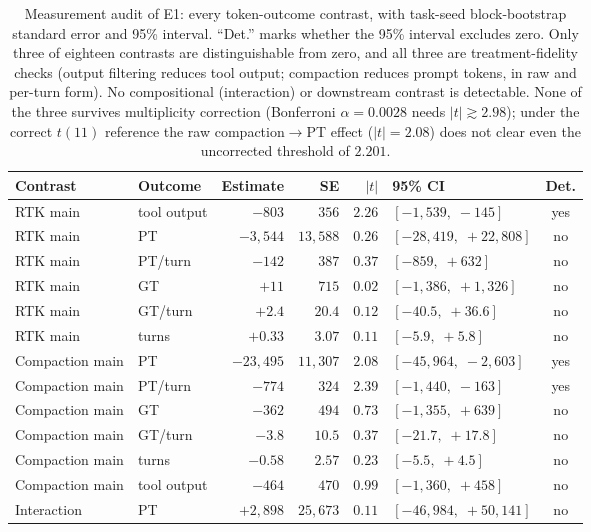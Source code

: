 \documentclass{article}
\begin{document}
\begin{table}[!htbp]
\caption{Measurement audit of E1: every token-outcome contrast, with task-seed block-bootstrap standard error and 95\% interval. ``Det.'' marks whether the 95\% interval excludes zero. Only three of eighteen contrasts are distinguishable from zero, and all three are treatment-fidelity checks (output filtering reduces tool output; compaction reduces prompt tokens, in raw and per-turn form). No compositional (interaction) or downstream contrast is detectable. None of the three survives multiplicity correction (Bonferroni $\alpha=0.0028$ needs $|t|\gtrsim2.98$); under the correct $t(11)$ reference the raw compaction$\rightarrow$PT effect ($|t|=2.08$) does not clear even the uncorrected threshold of $2.201$.}
\label{tab:audit}
\centering
\footnotesize
\setlength{\tabcolsep}{4pt}
\begin{tabularx}{\textwidth}{@{}llrrrXc@{}}
\toprule
Contrast & Outcome & Estimate & SE & $|t|$ & 95\% CI & Det. \\
\midrule
RTK main & tool output & $-803$ & $356$ & $2.26$ & $[-1{,}539,\;-145]$ & yes \\
RTK main & PT & $-3{,}544$ & $13{,}588$ & $0.26$ & $[-28{,}419,\;+22{,}808]$ & no \\
RTK main & PT/turn & $-142$ & $387$ & $0.37$ & $[-859,\;+632]$ & no \\
RTK main & GT & $+11$ & $715$ & $0.02$ & $[-1{,}386,\;+1{,}326]$ & no \\
RTK main & GT/turn & $+2.4$ & $20.4$ & $0.12$ & $[-40.5,\;+36.6]$ & no \\
RTK main & turns & $+0.33$ & $3.07$ & $0.11$ & $[-5.9,\;+5.8]$ & no \\
\midrule
Compaction main & PT & $-23{,}495$ & $11{,}307$ & $2.08$ & $[-45{,}964,\;-2{,}603]$ & yes \\
Compaction main & PT/turn & $-774$ & $324$ & $2.39$ & $[-1{,}440,\;-163]$ & yes \\
Compaction main & GT & $-362$ & $494$ & $0.73$ & $[-1{,}355,\;+639]$ & no \\
Compaction main & GT/turn & $-3.8$ & $10.5$ & $0.37$ & $[-21.7,\;+17.8]$ & no \\
Compaction main & turns & $-0.58$ & $2.57$ & $0.23$ & $[-5.5,\;+4.5]$ & no \\
Compaction main & tool output & $-464$ & $470$ & $0.99$ & $[-1{,}360,\;+458]$ & no \\
\midrule
Interaction & PT & $+2{,}898$ & $25{,}673$ & $0.11$ & $[-46{,}984,\;+50{,}141]$ & no \\

\end{tabularx}
\end{table}
\end{document}
